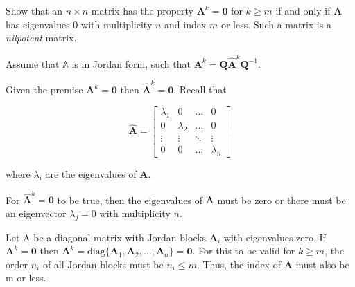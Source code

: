 \item [3.20] Show that an $n \times n$
matrix has the property $\mathbf{A}^k = \mathbf{0}$ for
$k \geq m$ if and only if $\mathbf{A}$
has eigenvalues 0 with multiplicity $n$ and index $m$ or less.
Such a matrix is a \emph{nilpotent} matrix.

Assume that $\mathbb{A}$ is in Jordan form, such that
$\mathbf{A}^k = \mathbf{Q} \hat{\mathbf{A}}^k \mathbf{Q}^{-1} $.

Given the premise $\mathbf{A}^k = \mathbf{0}$ then
$\hat{\mathbf{A}}^k = \mathbf{0}$.
Recall that

\begin{equation*}
 \hat{\mathbf{A}} = \begin{bmatrix}
                     \lambda_1 & 0  & \dots & 0\\
                     0 & \lambda_2  & \dots & 0\\
                     \vdots & \vdots& \ddots & \vdots\\
                     0 & 0 & \dots &  \lambda_n
                    \end{bmatrix}
\end{equation*}

where $\lambda_i$ are the eigenvalues of $\mathbf{A}$.

For $\hat{\mathbf{A}}^k = \mathbf{0}$ to be true,
then the eigenvalues of $\mathbf{A}$ must be zero or there must be
an eigenvector $\lambda_j = 0$ with multiplicity $n$.

Let A be a diagonal matrix with Jordan blocks $\mathbf{A}_i$
with eigenvalues zero.
If $\mathbf{A}^k = \mathbf{0}$ then
$\mathbf{A}^k = \text{diag}\{\mathbf{A}_1, \mathbf{A}_2, \dots, \mathbf{A}_n\}= \mathbf{0}$.
For this to be valid for $k \geq m$, the order $n_i$ of all Jordan blocks
must be $n_i \leq m$.
Thus, the index of $\mathbf{A}$ must also be m or less.
